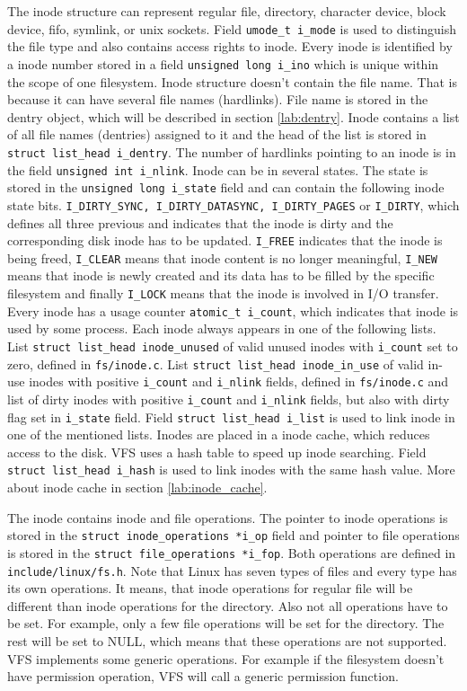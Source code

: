 The inode structure can represent  regular file, directory, character device,
block device, fifo, symlink, or unix sockets. Field \texttt{umode\_t i\_mode} is
used to distinguish the file type and also contains access rights to inode. Every
inode is identified by a inode number stored in a field \texttt{unsigned long i\_ino}
which is unique within the scope of one filesystem. Inode structure doesn't contain
the file name. That is because it can have several file names (hardlinks). File name is
stored in the dentry object, which will be described in section \ref{lab:dentry}. Inode
contains a list of all file names (dentries) assigned to it and the head of the list is
stored in \texttt{struct list\_head i\_dentry}. The number of hardlinks pointing to an
inode is in the field \texttt{unsigned int i\_nlink}. Inode can be in several states.
The state is stored in the \texttt{unsigned long i\_state} field and can contain the following
inode state bits. \texttt{I\_DIRTY\_SYNC, I\_DIRTY\_DATASYNC, I\_DIRTY\_PAGES} or
\texttt{I\_DIRTY}, which defines all three previous and indicates that the inode
is dirty and the corresponding disk inode has to be updated. \texttt{I\_FREE} indicates
that the inode is being freed, \texttt{I\_CLEAR} means that inode content is no longer
meaningful, \texttt{I\_NEW} means that inode is newly created and its data has to be
filled by the specific filesystem and finally \texttt{I\_LOCK} means that the inode is
involved in I/O transfer. Every inode has a usage counter \texttt{atomic\_t i\_count},
which indicates that inode is used by some process.
Each inode always appears in one of the following lists. List \texttt{struct
list\_head inode\_unused} of valid unused inodes with \texttt{i\_count} set to zero,
defined in \texttt{fs/inode.c}. List \texttt{struct list\_head inode\_in\_use} of
valid in-use inodes with positive \texttt{i\_count} and \texttt{i\_nlink} fields,
defined in \texttt{fs/inode.c} and list of dirty inodes with positive
\texttt{i\_count} and \texttt{i\_nlink} fields, but also with dirty flag set in
\texttt{i\_state} field. Field \texttt{struct list\_head i\_list} is used to link
inode in one of the mentioned lists. Inodes are placed in a inode cache, which reduces
access to the disk. VFS uses a hash table to speed up inode searching. Field
\texttt{struct list\_head i\_hash} is used to link inodes with the same hash value. More
about inode cache in section \ref{lab:inode_cache}.

The inode contains inode and file operations. The pointer to inode operations is stored in
the \texttt{struct inode\_operations *i\_op} field and pointer to file operations
is stored in the \texttt{struct file\_operations *i\_fop}. Both operations are defined
in \texttt{include/linux/fs.h}. Note that Linux has seven types of files and every type
has its own operations. It means, that inode operations for regular file will be
different than inode operations for the directory. Also not all operations have to be set.
For example, only a few file operations will be set for the directory. The rest will be set
to NULL, which means that these operations are not supported. VFS implements some
generic operations. For example if the filesystem doesn't have permission operation, VFS
will call a generic permission function.

